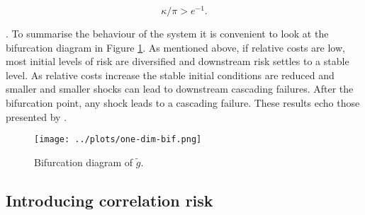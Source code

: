 \documentclass[../../main.tex]{subfiles}
\begin{document}
\begin{equation}
  \kappa / \pi > e^{-1}.
\end{equation}

. 
To summarise the behaviour of the system it is convenient to look at the bifurcation diagram in Figure \ref{fig:one-dimensional:bifurcation}. As mentioned above, if relative costs are low, most initial levels of risk are diversified and downstream risk settles to a stable level. As relative costs increase the stable initial conditions are reduced and smaller and smaller shocks can lead to downstream cascading failures. After the bifurcation point, any shock leads to a cascading failure. These results echo those presented by .

\begin{figure}[H]
  \centering
  \texttt{[image: ../plots/one-dim-bif.png]}
  \caption{Bifurcation diagram of $\tilde{g}$.}
  \label{fig:one-dimensional:bifurcation}
\end{figure}

\iffalse

Plotting the trajectory of an arbitrary starting level of risk around the bifurcation point $1/e$ (Figure \ref{fig:one-dimensional:trajectory}) we can see that upstream (for low $k$s) the level of risk in the two regimes is very close. Nevertheless, firms' underdiversification slowly allows risk to compound, until it diverges to $1$ downstream (for high $k$s).


\begin{figure}[H]
  \texttt{[image: ../plots/one-dim-trajectory.png]}
  \caption{Trajectory $\mu_k$, around bifurcation.}
  \label{fig:one-dimensional:trajectory}
  \centering
\end{figure}

\fi


\subsection{Introducing correlation risk}
\end{document}
